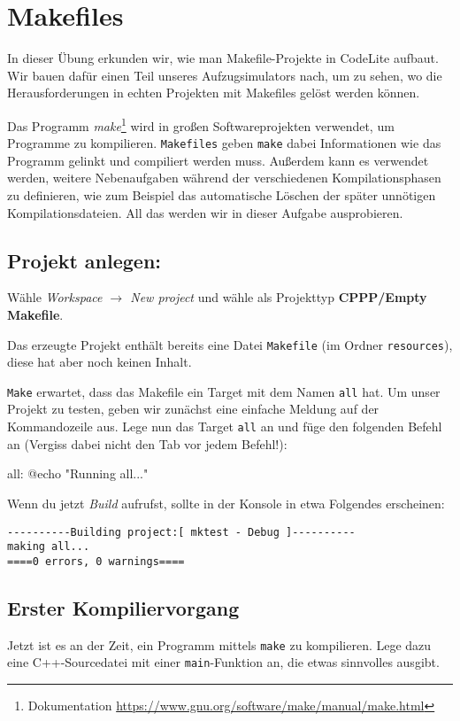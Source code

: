 \section{Makefiles}

In dieser Übung erkunden wir, wie man Makefile-Projekte in CodeLite aufbaut.
Wir bauen dafür einen Teil unseres Aufzugsimulators nach, um zu sehen, wo die Herausforderungen in echten Projekten mit Makefiles gelöst werden können.

Das Programm \emph{make}\footnote{Dokumentation \url{https://www.gnu.org/software/make/manual/make.html}} wird in großen Softwareprojekten verwendet, um Programme zu kompilieren.
\texttt{Makefiles} geben \texttt{make} dabei Informationen wie das Programm gelinkt und compiliert werden muss.
Außerdem kann es verwendet werden, weitere Nebenaufgaben während der verschiedenen Kompilationsphasen zu definieren, wie zum Beispiel das automatische Löschen der später unnötigen Kompilationsdateien.
All das werden wir in dieser Aufgabe ausprobieren.

\subsection{Projekt anlegen:}
Wähle \emph{Workspace $\to$ New project} und wähle als Projekttyp \textbf{CPPP/Empty Makefile}.

Das erzeugte Projekt enthält bereits eine Datei \texttt{Makefile} (im Ordner \texttt{resources}), diese hat aber noch keinen Inhalt.

\texttt{Make} erwartet, dass das Makefile ein Target mit dem Namen \lstinline{all} hat.
Um unser Projekt zu testen, geben wir zunächst eine einfache Meldung auf der Kommandozeile aus.
Lege nun das Target \lstinline{all} an und füge den folgenden Befehl an (Vergiss dabei nicht den Tab vor jedem Befehl!):
\begin{lstmake}
all:
    @echo "Running all..."
\end{lstmake}

Wenn du jetzt \emph{Build} aufrufst, sollte in der Konsole in etwa Folgendes erscheinen:
\begin{verbatim}
----------Building project:[ mktest - Debug ]----------
making all...
====0 errors, 0 warnings====

\end{verbatim}

\subsection{Erster Kompiliervorgang}
Jetzt ist es an der Zeit, ein Programm mittels \texttt{make} zu kompilieren.
Lege dazu eine C++-Sourcedatei  mit einer \lstinline{main}-Funktion an, die etwas sinnvolles ausgibt.


